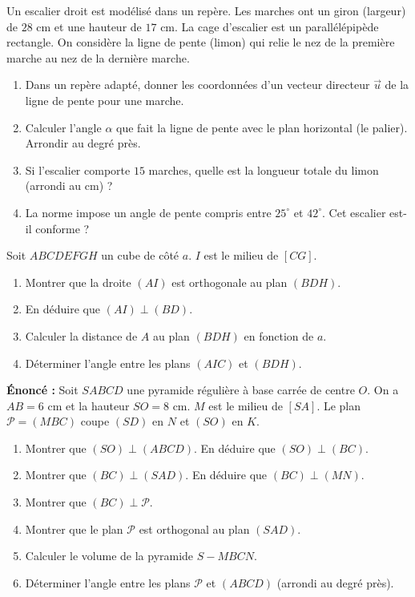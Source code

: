 \documentclass[11pt]{article}
\newcounter{popsec}
\newcounter{popsub}
\newcommand{\courssub}[1]{%
  \stepcounter{popsub}%
  \par\vspace{9pt}\noindent{\popxbold\fontsize{11.5}{13}\selectfont\color{popink}{\color{poporange}\thepopsec.\thepopsub}\hspace{6pt}#1}\par\nopagebreak\vspace{4pt}
}
\begin{document}
\begin{exercice}
Un escalier droit est modélisé dans un repère. Les marches ont un giron (largeur) de $28$ cm et une hauteur de $17$ cm. La cage d'escalier est un parallélépipède rectangle. On considère la ligne de pente (limon) qui relie le nez de la première marche au nez de la dernière marche.
\begin{enumerate}
    \item Dans un repère adapté, donner les coordonnées d'un vecteur directeur $\vec{u}$ de la ligne de pente pour une marche.
    \item Calculer l'angle $\alpha$ que fait la ligne de pente avec le plan horizontal (le palier). Arrondir au degré près.
    \item Si l'escalier comporte $15$ marches, quelle est la longueur totale du limon (arrondi au cm) ?
    \item La norme impose un angle de pente compris entre $25^\circ$ et $42^\circ$. Cet escalier est-il conforme ?
\end{enumerate}
\end{exercice}

\begin{exercice}
Soit $ABCDEFGH$ un cube de côté $a$. $I$ est le milieu de $[CG]$.
\begin{enumerate}
    \item Montrer que la droite $(AI)$ est orthogonale au plan $(BDH)$.
    \item En déduire que $(AI) \perp (BD)$.
    \item Calculer la distance de $A$ au plan $(BDH)$ en fonction de $a$.
    \item Déterminer l'angle entre les plans $(AIC)$ et $(BDH)$.
\end{enumerate}
\end{exercice}

\courssub{Je me prépare au Probatoire}

\begin{exercice}
\textbf{Énoncé :} Soit $SABCD$ une pyramide régulière à base carrée de centre $O$. On a $AB = 6$ cm et la hauteur $SO = 8$ cm. $M$ est le milieu de $[SA]$. Le plan $\mathcal{P} = (MBC)$ coupe $(SD)$ en $N$ et $(SO)$ en $K$.
\begin{enumerate}
    \item Montrer que $(SO) \perp (ABCD)$. En déduire que $(SO) \perp (BC)$.
    \item Montrer que $(BC) \perp (SAD)$. En déduire que $(BC) \perp (MN)$.
    \item Montrer que $(BC) \perp \mathcal{P}$.
    \item Montrer que le plan $\mathcal{P}$ est orthogonal au plan $(SAD)$.
    \item Calculer le volume de la pyramide $S-MBCN$.
    \item Déterminer l'angle entre les plans $\mathcal{P}$ et $(ABCD)$ (arrondi au degré près).
\end{enumerate}
\end{exercice}
\end{document}
